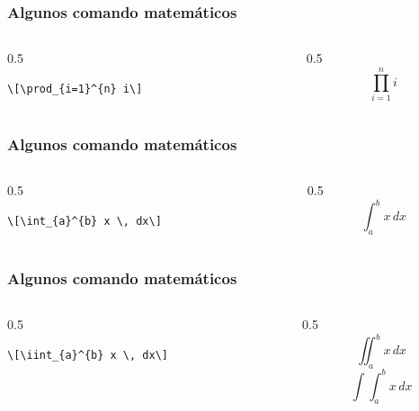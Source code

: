 \documentclass[12pt,aspectratio=169,ignorenonframetext]{ltxbeamer}
\begin{document}
\begin{frame}[fragile]
\frametitle{Algunos comando matemáticos}

\begin{columns}
    \begin{column}{0.5\textwidth}
        \begin{verbatim}
\[\prod_{i=1}^{n} i\]
        \end{verbatim}
    \end{column}
    {\color{gray} \vline}
    \begin{column}{0.5\textwidth}
        \[\prod_{i=1}^{n} i\]
    \end{column}
\end{columns}
\end{frame}





\begin{frame}[fragile]
\frametitle{Algunos comando matemáticos}

\begin{columns}
    \begin{column}{0.5\textwidth}
        \begin{verbatim}
\[\int_{a}^{b} x \, dx\]
        \end{verbatim}
    \end{column}
    {\color{gray} \vline}
    \begin{column}{0.5\textwidth}
        \[\int_{a}^{b} x \, dx\]
    \end{column}
\end{columns}
\end{frame}





\begin{frame}[fragile]
\frametitle{Algunos comando matemáticos}

\begin{columns}
    \begin{column}{0.5\textwidth}
        \begin{verbatim}
\[\iint_{a}^{b} x \, dx\]
        \end{verbatim}
    \end{column}
    {\color{gray} \vline}
    \begin{column}{0.5\textwidth}
        \[\iint_{a}^{b} x \, dx\]
        \pause
        \[\int\int_{a}^b x \, dx\]
    \end{column}
\end{columns}
\end{frame}
\end{document}
